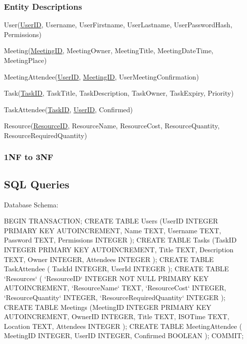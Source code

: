 \subsubsection{Entity Descriptions}
User(\underline{UserID}, Username, UserFirstname, UserLastname, UserPasswordHash, Permissions)

Meeting(\underline{MeetingID}, MeetingOwner, MeetingTitle, MeetingDateTime, MeetingPlace)

MeetingAttendee(\underline{UserID}, \underline{MeetingID}, UserMeetingConfirmation)

Task(\underline{TaskID}, TaskTitle, TaskDescription, TaskOwner, TaskExpiry, Priority)

TaskAttendee(\underline{TaskID}, \underline{UserID}, Confirmed)

Resource(\underline{ResourceID}, ResourceName, ResourceCost, ResourceQuantity, ResourceRequiredQuantity)

\subsubsection{1NF to 3NF}


\subsection{SQL Queries}

    Database Schema:
\begin{sql}
    BEGIN TRANSACTION;
CREATE TABLE Users
                (UserID INTEGER PRIMARY KEY AUTOINCREMENT,
                Name TEXT,
                Username TEXT,
                Password TEXT,
                Permissions INTEGER
                );
CREATE TABLE Tasks
                (TaskID INTEGER PRIMARY KEY AUTOINCREMENT,
                Title TEXT,
                Description TEXT,
                Owner INTEGER,
                Attendees INTEGER
                );
CREATE TABLE TaskAttendee
                (
                TaskId INTEGER,
                UserId INTEGER
                );
CREATE TABLE `Resources` (
	`ResourceID`	INTEGER NOT NULL PRIMARY KEY AUTOINCREMENT,
	`ResourceName`	TEXT,
	`ResourceCost`	INTEGER,
	`ResourceQuantity`	INTEGER,
	`ResourceRequiredQuantity`	INTEGER
);
CREATE TABLE Meetings
                (MeetingID INTEGER PRIMARY KEY AUTOINCREMENT,
                OwnerID INTEGER,
                Title TEXT,
                ISOTime TEXT,
                Location TEXT,
                Attendees INTEGER
                );
CREATE TABLE MeetingAttendee
(
    MeetingID INTEGER,
    UserID INTEGER,
    Confirmed BOOLEAN
);
COMMIT;
\end{sql}


